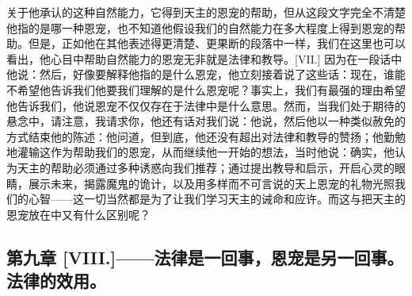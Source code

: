 关于他承认的这种自然能力，它得到天主的恩宠的帮助，但从这段文字完全不清楚他指的是哪一种恩宠，也不知道他假设我们的自然能力在多大程度上得到恩宠的帮助。但是，正如他在其他表述得更清楚、更果断的段落中一样，我们在这里也可以看出，他心目中帮助自然能力的恩宠无非就是法律和教导。\newline{}[VII.] 因为在一段话中他说：\newline{}然后，好像要解释他指的是什么恩宠，他立刻接着说了这些话：\newline{}现在，谁能不希望他告诉我们他要我们理解的是什么恩宠呢？事实上，我们有最强的理由希望他告诉我们，他说恩宠不仅仅存在于法律中是什么意思。\newline{}然而，当我们处于期待的悬念中，请注意，我请求你，他还有话对我们说：他说，\newline{}然后他以一种类似赦免的方式结束他的陈述：他问道，\newline{}但到底，他还没有超出对法律和教导的赞扬；他勤勉地灌输这作为帮助我们的恩宠，从而继续他一开始的想法，当时他说：\newline{}确实，他认为天主的帮助必须通过多种诱惑向我们推荐；通过提出教导和启示，开启心灵的眼睛，展示未来，揭露魔鬼的诡计，以及用多样而不可言说的天上恩宠的礼物光照我们的心智——这一切当然都是为了让我们学习天主的诫命和应许。而这与把天主的恩宠放在中又有什么区别呢？\par


\subsection{第九章 [VIII.]——法律是一回事，恩宠是另一回事。法律的效用。}


